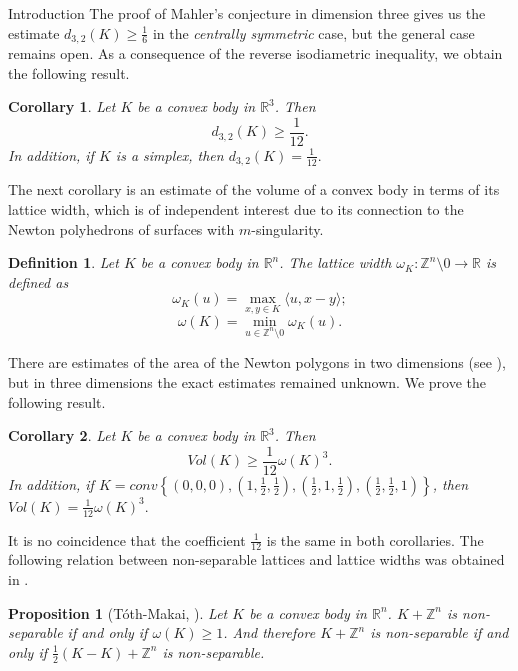 \documentclass[12pt]{article}
\newcommand\R{\mathbb R}
\newcommand\Z{\mathbb Z}
\newtheorem{proposition}{Proposition}[section]
\newtheorem{definition}{Definition}[section]
\newtheorem{Corollary}{Corollary}[section]
\begin{document}
\begin{section}{Introduction}
    The proof of Mahler's conjecture in dimension three gives us the estimate  $d_{3,2}(K)\geq \frac{1}{6}$ in the \textit{centrally symmetric} case, but the general case remains open. As a consequence of the reverse isodiametric inequality, we obtain the following result.
    \begin{Corollary}
    \label{d32}
         Let $K$ be a convex body in $\R^{3}$. Then 
         $$
            d_{3,2}(K)\geq \frac{1}{12}.
         $$
    In addition, if $K$ is a simplex, then $d_{3,2}(K) = \frac{1}{12}.$
    \end{Corollary}

    The next corollary is an estimate of the volume of a  convex body in terms of its lattice width, which is of independent interest due to its connection to the Newton 
polyhedrons of surfaces with $m$-singularity. 

 \begin{definition} Let $K$ be a convex body in $\R^{n}$. The 
        lattice width $\omega_{K}:\Z^{n}\setminus{0}\to \R$ is defined as 
        $$
        \omega_{K}(u)=\max_{x,y\in K}\langle u, x-y\rangle;
        $$
        $$
            \omega(K) = \min_{u\in \mathbb{Z}^{n}\setminus 0} \omega_{K}(u).
        $$
    \end{definition}



There are estimates of the area of the Newton polygons in two dimensions (see \cite{nk1,nk2}), but in three dimensions the exact estimates remained unknown. We prove the following result.  
    \begin{Corollary}
    \label{lattice-width}
        Let $K$ be a convex body in $\R^{3}$. Then 
         $$
            Vol(K)\geq \frac{1}{12}\omega(K)^3.
         $$
    In addition, if $K = conv\left\{(0,0,0),  \left(1,\frac{1}{2},\frac{1}{2}\right),\left(\frac{1}{2},1,\frac{1}{2}\right),\left(\frac{1}{2},\frac{1}{2},1\right)\right\}$, then $Vol(K) = \frac{1}{12}\omega(K)^3.$
    \end{Corollary}

    It is no coincidence that the coefficient $\frac{1}{12}$ is the same in both corollaries. The following relation between non-separable lattices and lattice widths was obtained in \cite{makai1974}.

    \begin{proposition}
    [T\' oth-Makai, \cite{makai1974}]
    \label{nonsep}  Let $K$ be a convex body in $\R^{n}$.
        $K+\Z^{n}$ is non-separable if and only if $\omega(K)\geq 1$.  And therefore $K+\Z^{n}$ is non-separable if and only if $\frac{1}{2}(K-K)+\Z^{n}$ is non-separable.  
    \end{proposition}

    

    
        
\end{section}
\end{document}
